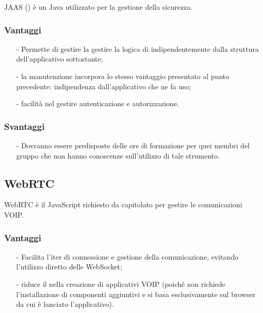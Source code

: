 JAAS () è un  Java utilizzato per la gestione della sicurezza.

\subsubsection*{Vantaggi}
\begin{itemize}[noitemsep,nolistsep]
	\item[-] Permette di gestire la gestire la logica di  indipendentemente dalla struttura dell'applicativo sottostante;
	\item[-] la manutenzione incorpora lo stesso vantaggio presentato al punto precedente: indipendenza dall'applicativo che ne fa uso;
	\item[-] facilità nel gestire autenticazione e autorizzazione.
\end{itemize}

\subsubsection*{Svantaggi}
\begin{itemize}[noitemsep,nolistsep]
  \item[-] Dovranno essere predisposte delle ore di formazione per quei membri del gruppo che non hanno conoscenze sull'utilizzo di tale strumento.
\end{itemize}

\subsection{WebRTC}\label{sec:hibernate}

WebRTC è il  JavaScript richiesto da capitolato per gestire le comunicazioni VOIP.

\subsubsection*{Vantaggi}
\begin{itemize}[noitemsep,nolistsep]
	\item[-] Facilita l'iter di connessione e gestione della comunicazione, evitando l'utilizzo diretto delle WebSocket;
	\item[-] riduce il  nella creazione di applicativi VOIP (poiché non richiede l'installazione di componenti aggiuntivi e si basa esclusivamente sul browser da cui è lanciato l'applicativo).
\end{itemize}

